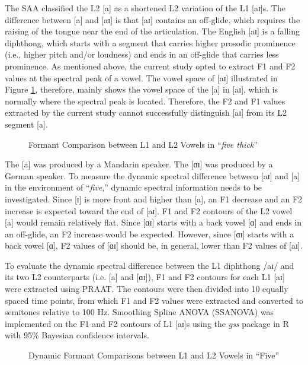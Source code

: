 The SAA classified the L2 [a] as a shortened L2 variation of the L1 [aɪ]s. The difference between [a] and [aɪ] is that [aɪ] contains an off-glide, which requires the raising of the tongue near the end of the articulation. The English [aɪ] is a falling diphthong, which starts with a segment that carries higher prosodic prominence (i.e., higher pitch and/or loudness) and ends in an off-glide that carries less prominence. As mentioned above, the current study opted to extract F1 and F2 values at the spectral peak of a vowel. The vowel space of [aɪ] illustrated in Figure \ref{fig:five}, therefore, mainly shows the vowel space of the [a] in [aɪ], which is normally where the spectral peak is located. Therefore, the F2 and F1 values extracted by the current study cannot successfully distinguish [aɪ] from its L2 segment [a].  

\begin{figure}[h]
  \figSpace
    \centering
    
    \caption{Formant Comparison between L1 and L2 Vowels in “\textit{five thick}”}
    \label{fig:five}
  \figSpace
\end{figure}

The [a] was produced by a Mandarin speaker. The [ɑɪ] was produced by a German speaker. To measure the dynamic spectral difference between [aɪ] and [a] in the environment of  “\textit{five},” dynamic spectral information needs to be investigated. Since [ɪ] is more front and higher than [a], an F1 decrease and an F2 increase is expected toward the end of [aɪ]. F1 and F2 contours of the L2 vowel [a] would remain relatively flat. Since [ɑɪ] starts with a back vowel [ɑ] and ends in an off-glide, an F2 increase would be expected. However, since [ɑɪ] starts with a back vowel [ɑ], F2 values of [ɑɪ] should be, in general, lower than F2 values of [aɪ]. 

To evaluate the dynamic spectral difference between the L1 diphthong /aɪ/ and its two L2 counterparts (i.e. [a] and [ɑɪ]), F1 and F2 contours for each L1 [aɪ] were extracted using PRAAT. The contours were then divided into 10 equally spaced time points, from which F1 and F2 values were extracted and converted to semitones relative to 100 Hz. Smoothing Spline ANOVA (SSANOVA) was implemented on the F1 and F2 contours of L1 [aɪ]s using the \textit{gss} package in R \citep{Gu_2013} with 95\% Bayesian confidence intervals. 

\begin{figure}[h]
  \figSpace
    \centering
    
    \caption{Dynamic Formant Comparisons between L1 and L2 Vowels in “Five”}
    \label{fig:ay}
  \figSpace
\end{figure}

